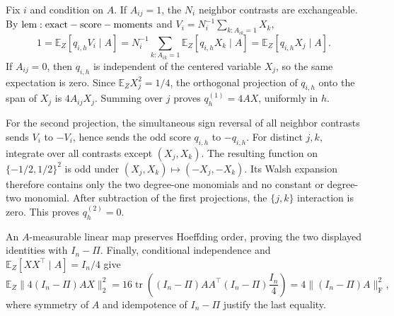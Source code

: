 Fix \(i\) and condition on \(A\).  If \(A_{ij}=1\), the \(N_i\) neighbor contrasts are exchangeable.  By \({\rm lem:exact-score-moments}\) and \(V_i=N_i^{-1}\sum_{k:A_{ik}=1}X_k\),
\[
 1=\mathbb E_Z[q_{i,h}V_i\mid A]
 =N_i^{-1}\sum_{k:A_{ik}=1}\mathbb E_Z[q_{i,h}X_k\mid A]
 =\mathbb E_Z[q_{i,h}X_j\mid A].
\]
If \(A_{ij}=0\), then \(q_{i,h}\) is independent of the centered variable \(X_j\), so the same expectation is zero.  Since \(\mathbb E_ZX_j^2=1/4\), the orthogonal projection of \(q_{i,h}\) onto the span of \(X_j\) is \(4A_{ij}X_j\).  Summing over \(j\) proves \(q_h^{(1)}=4AX\), uniformly in \(h\).

For the second projection, the simultaneous sign reversal of all neighbor contrasts sends \(V_i\) to \(-V_i\), hence sends the odd score \(q_{i,h}\) to \(-q_{i,h}\).  For distinct \(j,k\), integrate over all contrasts except \((X_j,X_k)\).  The resulting function on \(\{-1/2,1/2\}^2\) is odd under \((X_j,X_k)\mapsto(-X_j,-X_k)\).  Its Walsh expansion therefore contains only the two degree-one monomials and no constant or degree-two monomial.  After subtraction of the first projections, the \(\{j,k\}\) interaction is zero.  This proves \(q_h^{(2)}=0\).

An \(A\)-measurable linear map preserves Hoeffding order, proving the two displayed identities with \(I_n-\Pi\).  Finally, conditional independence and \(\mathbb E_Z[XX^\top\mid A]=I_n/4\) give
\[
 \mathbb E_Z\|4(I_n-\Pi)AX\|_2^2
 =16\operatorname{tr}\!\left((I_n-\Pi)AA^\top(I_n-\Pi)\frac{I_n}{4}\right)
 =4\|(I_n-\Pi)A\|_{\mathrm F}^2,
\]
where symmetry of \(A\) and idempotence of \(I_n-\Pi\) justify the last equality.